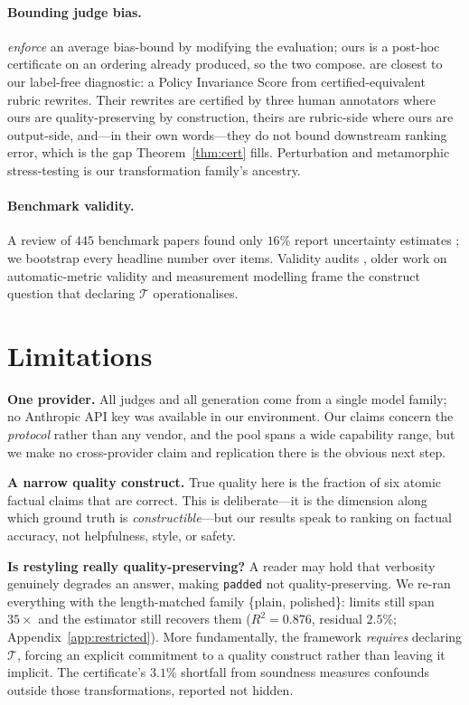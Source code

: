 \documentclass{article}
\theoremstyle{plain}
\theoremstyle{definition}
\begin{document}
\paragraph{Bounding judge bias.} \citet{feuer2026biasbounded} \emph{enforce} an average
bias-bound by modifying the evaluation; ours is a post-hoc certificate on an ordering already
produced, so the two compose. \citet{weng2026policy} are closest to our label-free diagnostic: a
Policy Invariance Score from certified-equivalent rubric rewrites. Their rewrites are certified
by three human annotators where ours are quality-preserving by construction, theirs are
rubric-side where ours are output-side, and---in their own words---they do not bound downstream
ranking error, which is the gap Theorem~\ref{thm:cert} fills. Perturbation and metamorphic
stress-testing \citep{judgeharness2026,perteval2024,singlechar2025} is our transformation
family's ancestry.

\paragraph{Benchmark validity.} A review of $445$ benchmark papers found only $16\%$ report
uncertainty estimates \citep{constructvalidity2025}; we bootstrap every headline number over
items. Validity audits \citep{toolcallingaudit2026}, older work on automatic-metric validity
\citep{reiter2018structured,chaganty2018price} and measurement modelling
\citep{jacobs2021measurement} frame the construct question that declaring $\mathcal{T}$
operationalises.

\section{Limitations}

\textbf{One provider.} All judges and all generation come from a single model family; no
Anthropic API key was available in our environment. Our claims concern the \emph{protocol}
rather than any vendor, and the pool spans a wide capability range, but we make no
cross-provider claim and replication there is the obvious next step.

\textbf{A narrow quality construct.} True quality here is the fraction of six atomic factual
claims that are correct. This is deliberate---it is the dimension along which ground truth is
\emph{constructible}---but our results speak to ranking on factual accuracy, not helpfulness,
style, or safety.

\textbf{Is restyling really quality-preserving?} A reader may hold that verbosity genuinely
degrades an answer, making \texttt{padded} not quality-preserving. We re-ran everything with
the length-matched family \{plain, polished\}: limits still span $35\times$ and the estimator
still recovers them ($R^2=0.876$, residual $2.5\%$; Appendix~\ref{app:restricted}). More
fundamentally, the framework \emph{requires} declaring $\mathcal{T}$, forcing an explicit
commitment to a quality construct rather than leaving it implicit. The certificate's $3.1\%$
shortfall from soundness measures confounds outside those transformations, reported not hidden.
\end{document}
